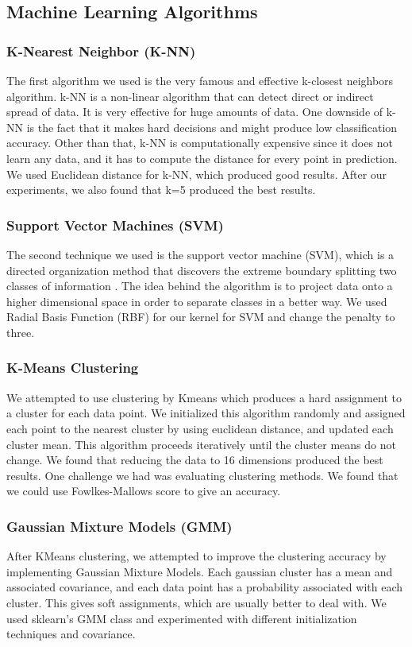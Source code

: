 \subsection{Machine Learning Algorithms}
\subsubsection{\textbf{K-Nearest Neighbor (K-NN)}}
The first algorithm we used is the very famous and effective k-closest neighbors algorithm. k-NN is a non-linear algorithm that can detect direct or indirect spread of data. It is very effective for huge amounts of data. One downside of k-NN is the fact that it makes hard decisions and might produce low classification accuracy. Other than that, k-NN is computationally expensive since it does not learn any data, and it has to compute the distance for every point in prediction. We used Euclidean distance for k-NN, which produced good results. After our experiments, we also found that k=5 produced the best results. 

\subsubsection{\textbf{Support Vector Machines (SVM)}}
The second technique we used is the support vector machine (SVM), which is a directed organization method that discovers the extreme boundary splitting two classes of information \cite{SVM:2006}. The idea behind the algorithm is to project data onto a higher dimensional space in order to separate classes in a better way. We used Radial Basis Function (RBF) for our kernel for SVM and change the penalty to three. 


\subsubsection{\textbf{K-Means Clustering}}
We attempted to use clustering by Kmeans which produces a hard assignment to a cluster for each data point. We initialized this algorithm randomly and assigned each point to the nearest cluster by using euclidean distance, and updated each cluster mean. This algorithm proceeds iteratively until the cluster means do not change. We found that reducing the data to 16 dimensions produced the best results. One challenge we had was evaluating clustering methods. We found that we could use Fowlkes-Mallows score to give an accuracy.

\subsubsection{\textbf{Gaussian Mixture Models (GMM)}}
After KMeans clustering, we attempted to improve the clustering accuracy by implementing Gaussian Mixture Models. Each gaussian cluster has a mean and associated covariance, and each data point has a probability associated with each cluster. This gives soft assignments, which are usually better to deal with. We used sklearn's GMM class and experimented with different initialization techniques and covariance. 

